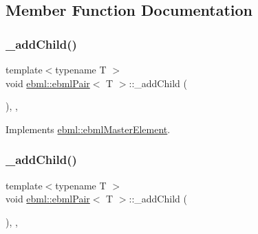 \subsection{Member Function Documentation}
\mbox{\label{classebml_1_1ebmlPair_affcffc81a14642fbc375d2fcdbfa29f3}} 
\subsubsection{\texorpdfstring{\+\_\+add\+Child()}{\_addChild()}\hspace{0.1cm}{\footnotesize\ttfamily [1/2]}}
{\footnotesize\ttfamily template$<$typename T $>$ \\
void \mbox{\hyperlink{classebml_1_1ebmlPair}{ebml\+::ebml\+Pair}}$<$ T $>$\+::\+\_\+add\+Child (\begin{DoxyParamCaption}\item[{const \mbox{\hyperlink{namespaceebml_adad533b7705a16bb360fe56380c5e7be}{ebml\+Element\+\_\+sp}} \&}]{ }\end{DoxyParamCaption})\hspace{0.3cm}{\ttfamily [override]}, {\ttfamily [protected]}, {\ttfamily [virtual]}}



Implements \mbox{\hyperlink{classebml_1_1ebmlMasterElement_a59c5f3b3409fd5fd6f0f22c7a68f1c9b}{ebml\+::ebml\+Master\+Element}}.

\mbox{\label{classebml_1_1ebmlPair_a3baa6b65958e830a0fb9e0d80f6497b5}} 
\subsubsection{\texorpdfstring{\+\_\+add\+Child()}{\_addChild()}\hspace{0.1cm}{\footnotesize\ttfamily [2/2]}}
{\footnotesize\ttfamily template$<$typename T $>$ \\
void \mbox{\hyperlink{classebml_1_1ebmlPair}{ebml\+::ebml\+Pair}}$<$ T $>$\+::\+\_\+add\+Child (\begin{DoxyParamCaption}\item[{\mbox{\hyperlink{namespaceebml_adad533b7705a16bb360fe56380c5e7be}{ebml\+Element\+\_\+sp}} \&\&}]{ }\end{DoxyParamCaption})\hspace{0.3cm}{\ttfamily [override]}, {\ttfamily [protected]}, {\ttfamily [virtual]}}



